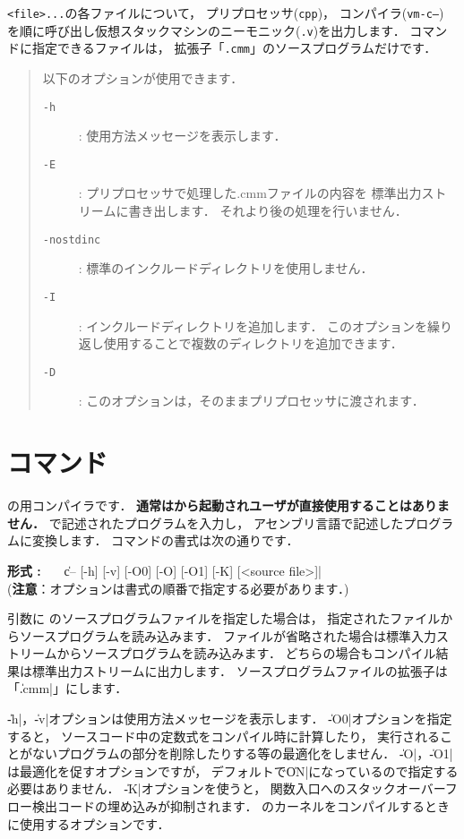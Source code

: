 {\tt <file>...}の各ファイルについて，
プリプロセッサ({\tt cpp})，
コンパイラ({\tt vm-c--})
を順に呼び出し仮想スタックマシンのニーモニック({\tt .v})を出力します．
{\cmv}コマンドに指定できるファイルは，
拡張子「{\tt .cmm}」の{\cmml}ソースプログラムだけです．

\begin{quote}
\hspace{-1em}以下のオプションが使用できます．

\begin{description}
\item[{\tt -h}] : 使用方法メッセージを表示します．
\item[{\tt -E}] : プリプロセッサで処理した{.cmm}ファイルの内容を
標準出力ストリームに書き出します．
それより後の処理を行いません．
\item[{\tt -nostdinc}] : 標準のインクルードディレクトリを使用しません．
\item[{\tt -I}] : インクルードディレクトリを追加します．
このオプションを繰り返し使用することで複数のディレクトリを追加できます．
\item[{\tt -D}] : このオプションは，そのままプリプロセッサに渡されます．
\end{description}
\end{quote}

\section{{\cmmc}コマンド}
\label{command:cmmc}

{\cmml}の{\tac}用コンパイラです．
{\bf 通常は{\cme}から起動されユーザが直接使用することはありません．}
\cmml で記述されたプログラムを入力し，
\tac アセンブリ言語で記述したプログラムに変換します．
\cmmc コマンドの書式は次の通りです．

\begin{flushleft}
{\bf 形式 : }~~~\|c-- [-h] [-v] [-O0] [-O] [-O1] [-K] [<source file>]|\\
({\bf 注意}：オプションは書式の順番で指定する必要があります．)
\end{flushleft}

引数に \cmml のソースプログラムファイルを指定した場合は，
指定されたファイルからソースプログラムを読み込みます．
ファイルが省略された場合は標準入力ストリームからソースプログラムを読み込みます．
どちらの場合もコンパイル結果は標準出力ストリームに出力します．
ソースプログラムファイルの拡張子は「\|.cmm|」にします．

\|-h|，\|-v|オプションは使用方法メッセージを表示します．
\|-O0|オプションを指定すると，
ソースコード中の定数式をコンパイル時に計算したり，
実行されることがないプログラムの部分を削除したりする等の最適化をしません．
\|-O|，\|-O1|は最適化を促すオプションですが，
デフォルトで\|ON|になっているので指定する必要はありません．
\|-K|オプションを使うと，
関数入口へのスタックオーバーフロー検出コードの埋め込みが抑制されます．
\tacos のカーネルをコンパイルするときに使用するオプションです．

